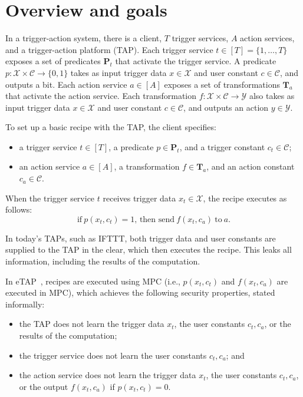 \section{Overview and goals}
\label{sec:problem}

In a trigger-action system, there is a client, $T$ trigger services, $A$ action
services, and a trigger-action platform (TAP). Each trigger service $t \in [T] =
\{1, \ldots, T\}$ exposes a set of predicates $\mathbf{P}_t$ that activate the
trigger service. A predicate $p : \mathcal{X} \times \mathcal{C} \to \{0,1\}$
takes as input trigger data $x \in \mathcal{X}$ and user constant $c \in
\mathcal{C}$, and outputs a bit. Each action service $a \in [A]$ exposes a set
of transformations $\mathbf{T}_a$ that activate the action service. Each
transformation $f : \mathcal{X} \times \mathcal{C} \to \mathcal{Y}$ also takes
as input trigger data $x \in \mathcal{X}$ and user constant $c \in \mathcal{C}$,
and outputs an action $y \in \mathcal{Y}$.

To set up a basic recipe with the TAP, the client specifies:
\begin{itemize}
  \item a trigger service $t \in [T]$, a predicate $p \in \mathbf{P}_t$, and a
    trigger constant $c_t \in \mathcal{C}$;
  \item an action service $a \in [A]$, a transformation $f \in \mathbf{T}_a$,
    and an action constant $c_a \in \mathcal{C}$.
\end{itemize}
When the trigger service $t$ receives trigger data $x_t \in \mathcal{X}$, the
recipe executes as follows:
\[
  \text{if}~p(x_t, c_t) = 1\text{, then send}~f(x_t, c_a)~\text{to}~a.
\]

In today's TAPs, such as IFTTT, both trigger data and user constants are
supplied to the TAP in the clear, which then executes the recipe. This leaks all
information, including the results of the computation.

In \textsf{eTAP}~\cite{DBLP:conf/sp/ChenCWSCF21}, recipes are executed using MPC
(i.e., $p(x_t, c_t)$ and $f(x_t, c_a)$ are executed in MPC), which achieves the
following security properties, stated informally:
\begin{itemize}
  \item the TAP does not learn the trigger data $x_t$, the user constants $c_t,
    c_a$, or the results of the computation;
  \item the trigger service does not learn the user constants $c_t, c_a$; and
  \item the action service does not learn the trigger data $x_t$, the user
    constants $c_t, c_a$, or the output $f(x_t, c_a)$ if $p(x_t, c_t) = 0$.
\end{itemize}

